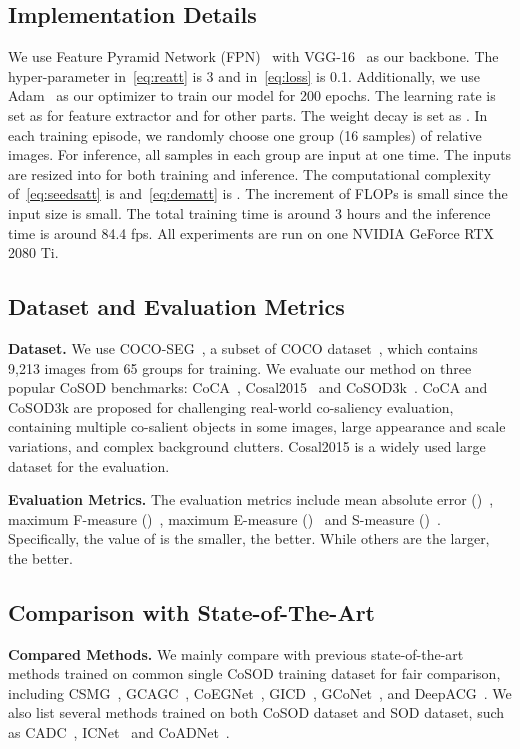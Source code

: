\documentclass[10pt,twocolumn,letterpaper]{article}
\begin{document}
\subsection{Implementation Details}
We use Feature Pyramid Network (FPN)~\cite{lin2017feature} with VGG-16~\cite{simonyan2014very} as our backbone. The hyper-parameter  in~\cref{eq:reatt} is 3 and  in~\cref{eq:loss} is 0.1. Additionally, we use Adam~\cite{kingma2014adam} as our optimizer to train our model for 200 epochs. The learning rate is set as  for feature extractor and  for other parts. The weight decay is set as . In each training episode, we randomly choose one group (16 samples) of relative images. For inference, all samples in each group are input at one time. The inputs are resized into  for both training and inference. The computational complexity of~\cref{eq:seedsatt} is  and~\cref{eq:dematt} is . The increment of FLOPs is small since the input size is small. The total training time is around 3 hours and the inference time is around 84.4 fps. All experiments are run on one NVIDIA GeForce RTX 2080 Ti.


\subsection{Dataset and Evaluation Metrics}
\textbf{Dataset.} We use COCO-SEG~\cite{wang2019robust}, a subset of COCO dataset~\cite{lin2014microsoft}, which contains 9,213 images from 65 groups for training. We evaluate our method on three popular CoSOD benchmarks: CoCA~\cite{zhang2020gradient}, Cosal2015~\cite{zhang2016detection} and CoSOD3k~\cite{fan2020taking}. CoCA and CoSOD3k are proposed for challenging real-world co-saliency evaluation, containing multiple co-salient objects in some images, large appearance and scale variations, and complex background clutters. Cosal2015 is a widely used large dataset for the evaluation.

\textbf{Evaluation Metrics.} The evaluation metrics include mean absolute error ()~\cite{cheng2013efficient}, maximum F-measure ()~\cite{achanta2009frequency}, maximum E-measure ({})~\cite{fan2018enhanced} and S-measure ()~\cite{fan2017structure}. Specifically, the value of  is the smaller, the better. While others are the larger, the better.

\subsection{Comparison with State-of-The-Art}
\textbf{Compared Methods.} We mainly compare with previous state-of-the-art methods trained on common single CoSOD training dataset for fair comparison, including CSMG~\cite{zhang2019co}, GCAGC~\cite{zhang2020adaptive}, CoEGNet~\cite{deng2021re}, GICD~\cite{zhang2020gradient}, GCoNet~\cite{fan2021group}, and DeepACG~\cite{zhang2021deepacg}. We also list several methods trained on both CoSOD dataset and SOD dataset, such as CADC~\cite{zhang2021summarize}, ICNet~\cite{jin2020icnet} and CoADNet~\cite{zhang2020coadnet}.
\end{document}
